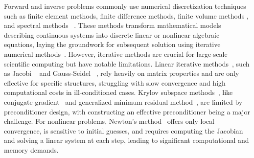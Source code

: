 \documentclass[preprint,numbers,sort&compress]{elsarticle}
\begin{document}
		
		Forward and inverse problems commonly use numerical discretization techniques~\cite{adler2025numerical} such as finite element methods, finite difference methods, finite volume methods , and spectral methods ~\cite{shen2011spectral}. These methods transform mathematical models describing continuous systems into discrete linear or nonlinear algebraic equations, laying the groundwork for subsequent solution using iterative numerical methods~\cite{zhang2024blending}. However, iterative methods are crucial for large-scale scientific computing but have notable limitations. Linear iterative methods~\cite{jiao2025one}, such as Jacobi ~\cite{zhang2024blending} and Gauss-Seidel ~\cite{ortega1966nonlinear}, rely heavily on matrix properties and are only effective for specific structures, struggling with slow convergence and high computational costs in ill-conditioned cases. Krylov subspace methods~\cite{saad1981krylov}, like conjugate gradient~\cite{hestenes1952methods} and generalized minimum residual method~\cite{saad1986gmres}, are limited by preconditioner design, with constructing an effective preconditioner being a major challenge. For nonlinear problems, Newton's method~\cite{sherman1978newton} offers only local convergence, is sensitive to initial guesses, and requires computing the Jacobian and solving a linear system at each step, leading to significant computational and memory demands.
		
\end{document}
